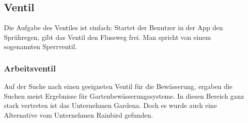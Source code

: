 \subsection{Ventil}
\label{sec:ventil}

Die Aufgabe des Ventiles ist einfach: Startet der Benutzer in der App den Sprühregen, gibt das Ventil den Flussweg frei. Man spricht von einem sogenannten Sperrventil. 

\subsubsection{Arbeitsventil}
\label{sec:ventilSuche}

Auf der Suche nach einen geeigneten Ventil für die Bewässerung, ergaben die Suchen meist Ergebnisse für Gartenbewässerungssysteme. In diesen Bereich ganz stark vertreten ist das Unternehmen Gardena. Doch es wurde auch eine Alternative vom Unternehmen Rainbird gefunden. 

